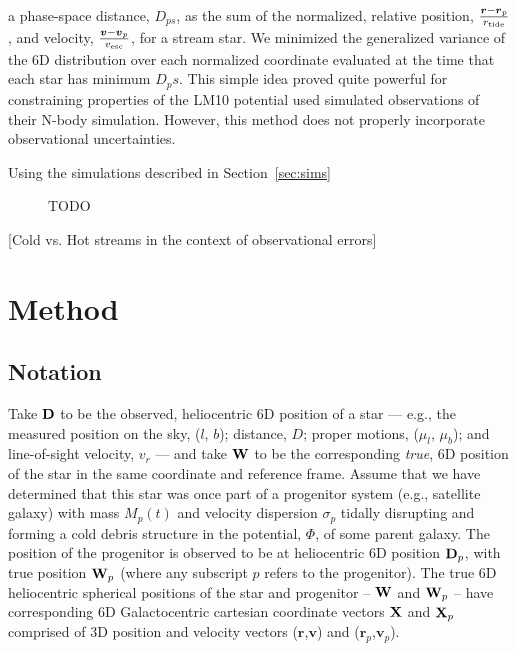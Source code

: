 \documentclass[letterpaper,12pt,preprint]{aastex}
\newcommand{\D}{{\bf D}}
\newcommand{\W}{{\bf W}}
\newcommand{\X}{{\bf X}}
\newcommand{\rtide}{r_{\rm tide}}
\newcommand{\bs}{\boldsymbol}
\begin{document}
a phase-space distance, $D_{ps}$, as the sum of the normalized, relative position, $\frac{\bs{r}-\bs{r}_p}{\rtide}$, and velocity, $\frac{\bs{v}-\bs{v}_p}{v_{\rm esc}}$, for a stream star. We minimized the generalized variance of the 6D distribution over each normalized coordinate evaluated at the time that each star has minimum $D_ps$. This simple idea proved quite powerful for constraining properties of the LM10 potential used simulated observations of their N-body simulation. However, this method does not properly incorporate observational uncertainties. 

Using the simulations described in Section~\ref{sec:sims}

\begin{figure}[h]
\begin{center}
\caption{ TODO }\label{fig:reldist}
\end{center}
\end{figure}


[Cold vs. Hot streams in the context of observational errors]

\section{Method}

\subsection{Notation}
Take $\D$ to be the observed, heliocentric 6D position of a star --- e.g., the measured position on the sky, ($l$, $b$); distance, $D$; proper motions, ($\mu_l$, $\mu_b$); and line-of-sight velocity, $v_r$ --- and take $\W$ to be the corresponding \emph{true}, 6D position of the star in the same coordinate and reference frame. Assume that we have determined that this star was once part of a progenitor system (e.g., satellite galaxy) with mass $M_p(t)$ and velocity dispersion $\sigma_p$ tidally disrupting and forming a cold debris structure in the potential, $\Phi$, of some parent galaxy. The position of the progenitor is observed to be at heliocentric 6D position $\D_p$, with true position $\W_p$ (where any subscript $p$ refers to the progenitor). The true 6D heliocentric spherical positions of the star and progenitor -- $\W$ and $\W_p$ -- have corresponding 6D Galactocentric cartesian coordinate vectors $\X$ and $\X_p$ comprised of 3D position and velocity vectors ($\bs{r}$,$\bs{v}$) and ($\bs{r}_p$,$\bs{v}_p$). 
\end{document}
